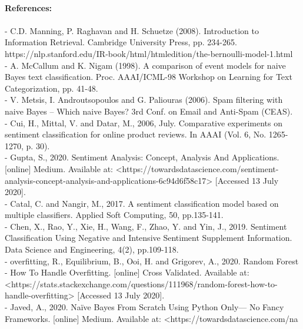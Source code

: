 \documentclass[12pt]{report}
\begin{document}
	\paragraph{References:}
	\paragraph{}
	- C.D. Manning, P. Raghavan and H. Schuetze (2008). Introduction to Information Retrieval. Cambridge University Press, pp. 234-265. https://nlp.stanford.edu/IR-book/html/htmledition/the-bernoulli-model-1.html\\
	
	- A. McCallum and K. Nigam (1998). A comparison of event models for naive Bayes text classification. Proc. AAAI/ICML-98 Workshop on Learning for Text Categorization, pp. 41-48.\\
	
	- V. Metsis, I. Androutsopoulos and G. Paliouras (2006). Spam filtering with naive Bayes – Which naive Bayes? 3rd Conf. on Email and Anti-Spam (CEAS).\\
	
	- Cui, H., Mittal, V. and Datar, M., 2006, July. Comparative experiments on sentiment classification for online product reviews. In AAAI (Vol. 6, No. 1265-1270, p. 30).\\
	
	- Gupta, S., 2020. Sentiment Analysis: Concept, Analysis And Applications. [online] Medium. Available at: <https://towardsdatascience.com/sentiment-analysis-concept-analysis-and-applications-6c94d6f58c17> [Accessed 13 July 2020].\\
	
	- Catal, C. and Nangir, M., 2017. A sentiment classification model based on multiple classifiers. Applied Soft Computing, 50, pp.135-141.\\
	
	- Chen, X., Rao, Y., Xie, H., Wang, F., Zhao, Y. and Yin, J., 2019. Sentiment Classification Using Negative and Intensive Sentiment Supplement Information. Data Science and Engineering, 4(2), pp.109-118.\\
	
	- overfitting, R., Equilibrium, B., Ooi, H. and Grigorev, A., 2020. Random Forest - How To Handle Overfitting. [online] Cross Validated. Available at: <https://stats.stackexchange.com/questions/111968/random-forest-how-to-handle-overfitting> [Accessed 13 July 2020].\\
	
	- Javed, A., 2020. Naïve Bayes From Scratch Using Python Only— No Fancy Frameworks. [online] Medium. Available at: <https://towardsdatascience.com/na%
	
	
\end{document}
